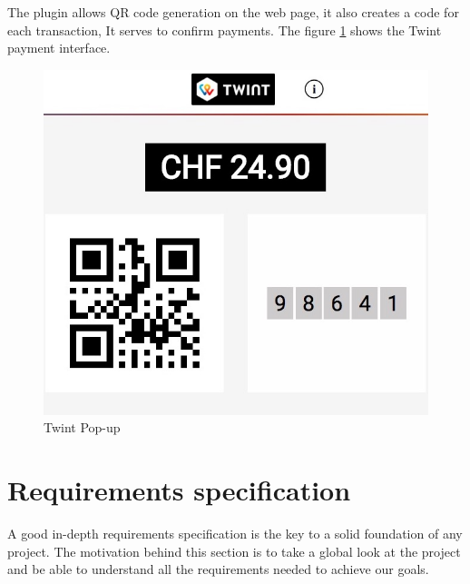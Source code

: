 \begin{spacing}{1.2}
\begin{itemize}
The plugin allows QR code generation on the web page, it also creates a code for each transaction, It serves to confirm payments.
The figure \ref{fig:twint} shows the Twint payment interface.
\begin{figure}[!ht]\centering
\includegraphics[scale=0.3]{twint.jpg}
\caption{Twint Pop-up}
\label{fig:twint}
\end{figure}
  \end{itemize}
  
  

\section{Requirements specification}
A good in-depth requirements specification is the key to a solid foundation of any project.
The motivation behind this section is to take a global look at the project and be able to understand all the requirements needed to achieve our goals.

\end{spacing}
